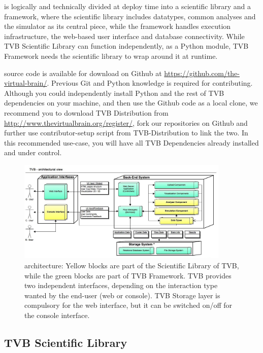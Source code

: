 
\TVB is logically and technically divided at deploy time into a scientific library and a framework, 
where the scientific library includes datatypes, common analyses and the simulator as its central piece,
while the framework handles execution infrastructure, the web-based user interface and database connectivity. 
While TVB Scientific Library can function independently, as a Python module, TVB Framework needs the scientific library to wrap around it at runtime.

\TVB source code is available for download on Github at \url{https://github.com/the-virtual-brain/}. Previous Git and Python knowledge is required for contributing.
Although you could independently install Python and the rest of TVB dependencies on your machine, and then use the Github code as a local clone, 
we recommend you to download TVB Distribution from \url{http://www.thevirtualbrain.org/register/}, fork our repositories on Github and further use
contributor-setup script from TVB-Distribution to link the two. In this recommended use-case, you will have all TVB Dependencies already installed 
 and under control.

 \begin{figure}
        \centering
        \includegraphics[width=0.90\textwidth]{images/architecture.jpg}
        \caption{\TVB architecture: 
        Yellow blocks are part of the Scientific Library of TVB, while the green blocks are part of TVB Framework.
        TVB provides two independent interfaces, depending on the interaction type wanted by the end-user (web or console).
        TVB Storage layer is compulsory for the web interface, but it can be switched on/off for the console interface.
         }
        \label{fig:architecture}
 \end{figure}


\subsection{TVB Scientific Library}

